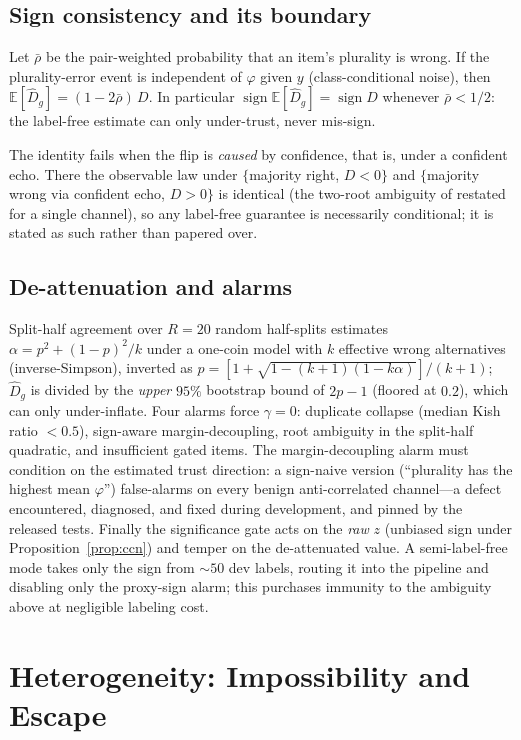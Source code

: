 \documentclass[twoside,11pt]{article}
\newcommand{\Dhat}{\widehat{D}}
\newcommand{\sign}{\operatorname{sign}}
\begin{document}
\subsection{Sign consistency and its boundary}
\begin{proposition}\label{prop:ccn}
Let $\bar\rho$ be the pair-weighted probability that an item's plurality is wrong. If the plurality-error event is independent of $\varphi$ given $y$ (class-conditional noise), then
$\mathbb{E}[\Dhat_g]=(1-2\bar\rho)\,D$.
In particular $\sign\mathbb{E}[\Dhat_g]=\sign D$ whenever $\bar\rho<1/2$: the label-free estimate can only under-trust, never mis-sign.
\end{proposition}
The identity fails when the flip is \emph{caused} by confidence, that is, under a confident echo. There the observable law under $\{$majority right, $D<0\}$ and $\{$majority wrong via confident echo, $D>0\}$ is identical (the two-root ambiguity of \citet{parisi2014ranking} restated for a single channel), so any label-free guarantee is necessarily conditional; it is stated as such rather than papered over.

\subsection{De-attenuation and alarms}
Split-half agreement over $R{=}20$ random half-splits estimates $\alpha=p^2+(1-p)^2/k$ under a one-coin model with $k$ effective wrong alternatives (inverse-Simpson), inverted as $p=[1+\sqrt{1-(k{+}1)(1-k\alpha)}]/(k{+}1)$; $\Dhat_g$ is divided by the \emph{upper} $95\%$ bootstrap bound of $2p-1$ (floored at $0.2$), which can only under-inflate. Four alarms force $\gamma=0$: duplicate collapse (median Kish ratio $<0.5$), sign-aware margin-decoupling, root ambiguity in the split-half quadratic, and insufficient gated items. The margin-decoupling alarm must condition on the estimated trust direction: a sign-naive version (``plurality has the highest mean $\varphi$'') false-alarms on every benign anti-correlated channel---a defect encountered, diagnosed, and fixed during development, and pinned by the released tests. Finally the significance gate acts on the \emph{raw} $z$ (unbiased sign under Proposition~\ref{prop:ccn}) and temper on the de-attenuated value. A semi-label-free mode takes only the sign from ${\sim}50$ dev labels, routing it into the pipeline and disabling only the proxy-sign alarm; this purchases immunity to the ambiguity above at negligible labeling cost.

\section{Heterogeneity: Impossibility and Escape}\label{sec:hetero}
\end{document}
